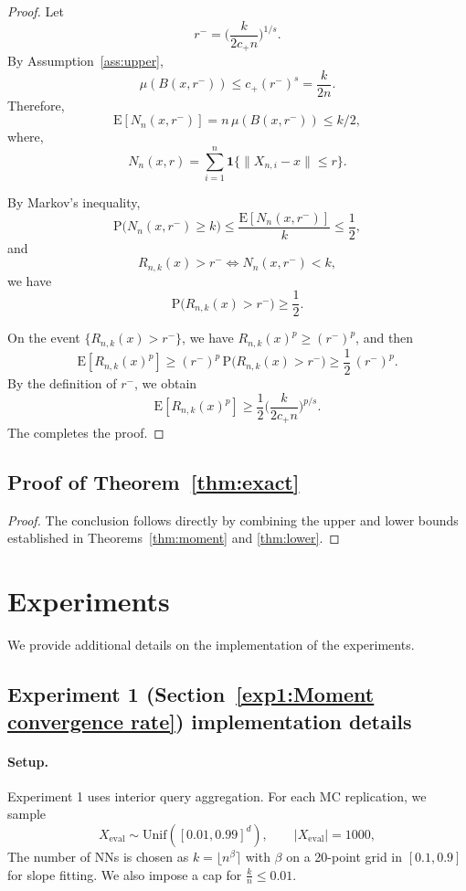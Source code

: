 \documentclass[12pt]{article}
\def\P{{\mathrm P}}
\def\E{{\mathrm E}}
\theoremstyle{definition}
\begin{document}
\begin{proof}
Let $$r^- = \Big(\frac{k}{2c_+ n}\Big)^{1/s}.$$ By Assumption~\ref{ass:upper},
\[
\mu(B(x,r^-)) \le c_+(r^-)^s = \frac{k}{2n}.
\]
Therefore,
\[
\E[N_n(x,r^-)]
=
n\,\mu(B(x,r^-))
\le k/2,
\]
where,
\[
N_n(x,r)=\sum_{i=1}^n \mathbf 1\{\|X_{n,i}-x\|\le r\}.
\]

By Markov's inequality,
\[
\P\big(N_n(x,r^-)\ge k\big)
\le
\frac{\E[N_n(x,r^-)]}{k}
\le \frac12,
\]
and
\[
R_{n,k}(x)>r^-
\iff
N_n(x,r^-)<k,
\]
we have
\[
\P\big(R_{n,k}(x)>r^-\big)\ge \frac12.
\]

On the event \(\{R_{n,k}(x)>r^-\}\), we have \(R_{n,k}(x)^p\ge (r^-)^p\), and then
\[
\E[R_{n,k}(x)^p]
\ge
(r^-)^p\,\P\big(R_{n,k}(x)>r^-\big)
\ge
\frac12\,(r^-)^p.
\]
By the definition of \(r^-\), we obtain
\[
\E[R_{n,k}(x)^p]
\ge
\frac12\Big(\frac{k}{2c_+ n}\Big)^{p/s}.
\]
The completes the proof.
\end{proof}

\subsection{Proof of Theorem~\ref{thm:exact}}

\begin{proof}
The conclusion follows directly by combining the upper and lower bounds established in Theorems~\ref{thm:moment} and \ref{thm:lower}.
\end{proof}


\section{Experiments}
We provide additional details on the implementation of the experiments.

\subsection{Experiment 1 (Section~\ref{exp1:Moment convergence rate}) implementation details}
\label{app: Experiment 1 implementation details}

\paragraph*{Setup.}
Experiment 1 uses interior query aggregation. For each MC replication, we sample 
\[
X_{\mathrm{eval}}\sim \mathrm{Unif}([0.01,0.99]^d),\qquad |X_{\mathrm{eval}}|=1000,
\]
The number of NNs is chosen as $k=\lfloor n^\beta\rceil$ with $\beta$ on a 20-point grid in $[0.1,0.9]$ for slope fitting. We also impose a cap for $\frac{k}{n}\le 0.01$. 
\end{document}
